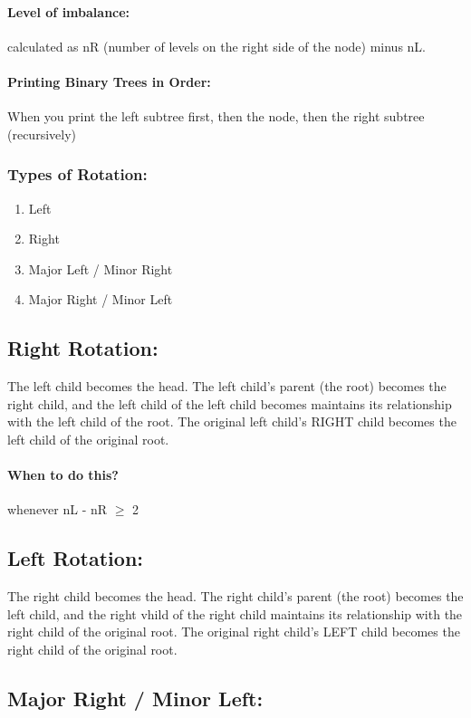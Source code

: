 \documentclass[a4paper,12pt]{report}
\begin{document}
\paragraph{Level of imbalance: } calculated as nR (number of levels on the right side of the node) minus nL.
\paragraph{Printing Binary Trees in Order: } When you print the left subtree first, then the node, then the right subtree (recursively)
\subsubsection{Types of Rotation: }
\begin{enumerate}
\item Left
\item Right
\item Major Left / Minor Right
\item Major Right / Minor Left
\end{enumerate}

\subsection{Right Rotation: }
The left child becomes the head. The left child's parent (the root) becomes the right child, and the left child of the left child becomes maintains its relationship with the left child of the root. The original left child's RIGHT child becomes the left child of the original root. 
\paragraph{When to do this? } whenever nL - nR $\geq$ 2

\subsection{Left Rotation: }
The right child becomes the head. The right child's parent (the root) becomes the left child, and the right vhild of the right child maintains its relationship with the right child of the original root. The original right child's LEFT child becomes the right child of the original root. 

\subsection{Major Right / Minor Left: }
\end{document}
